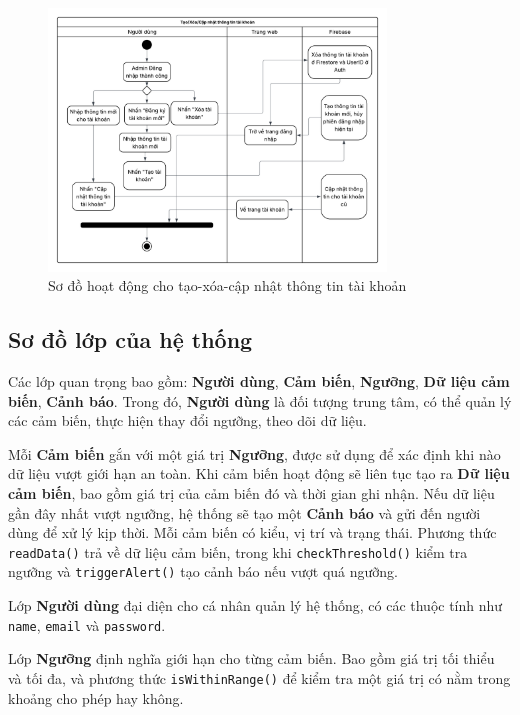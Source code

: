 \begin{figure}[H]
    \centering
    \includegraphics[width=0.8\textwidth]{figures/activity_4.png}
    \caption{Sơ đồ hoạt động cho tạo-xóa-cập nhật thông tin tài khoản}
    \label{fig:activity_4}
\end{figure}


\subsection{Sơ đồ lớp của hệ thống}

Các lớp quan trọng bao gồm: \textbf{Người dùng}, \textbf{Cảm biến}, \textbf{Ngưỡng}, \textbf{Dữ liệu cảm biến}, \textbf{Cảnh báo}. Trong đó, \textbf{Người dùng} là đối tượng trung tâm, có thể quản lý các cảm biến, thực hiện thay đổi ngưỡng, theo dõi dữ liệu.

Mỗi \textbf{Cảm biến} gắn với một giá trị \textbf{Ngưỡng}, được sử dụng để xác định khi nào dữ liệu vượt giới hạn an toàn. Khi cảm biến hoạt động sẽ liên tục tạo ra \textbf{Dữ liệu cảm biến}, bao gồm giá trị của cảm biến đó và thời gian ghi nhận. Nếu dữ liệu gần đây nhất vượt ngưỡng, hệ thống sẽ tạo một \textbf{Cảnh báo} và gửi đến người dùng để xử lý kịp thời. Mỗi cảm biến có kiểu, vị trí và trạng thái. Phương thức \texttt{readData()} trả về dữ liệu cảm biến, trong khi \texttt{checkThreshold()} kiểm tra ngưỡng và \texttt{triggerAlert()} tạo cảnh báo nếu vượt quá ngưỡng.

Lớp \textbf{Người dùng} đại diện cho cá nhân quản lý hệ thống, có các thuộc tính như \texttt{name}, \texttt{email} và \texttt{password}.

Lớp \textbf{Ngưỡng} định nghĩa giới hạn cho từng cảm biến. Bao gồm giá trị tối thiểu và tối đa, và phương thức \texttt{isWithinRange()} để kiểm tra một giá trị có nằm trong khoảng cho phép hay không.

